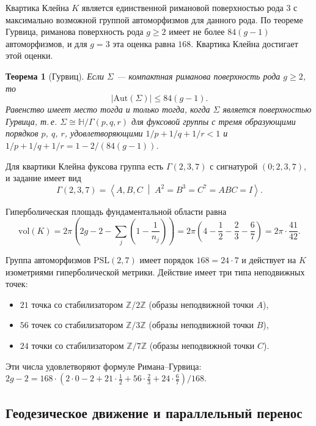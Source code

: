 \documentclass[12pt,a4paper]{article}
\newtheorem{theorem}{Теорема}[section]
\theoremstyle{definition}
\theoremstyle{remark}
\newcommand{\ZZ}{\mathbb{Z}}
\newcommand{\HH}{\mathbb{H}}
\newcommand{\PSL}{\mathrm{PSL}}
\newcommand{\Aut}{\mathrm{Aut}}
\begin{document}
Квартика Клейна $K$ является единственной римановой поверхностью рода $3$ с максимально возможной группой автоморфизмов для данного рода. По теореме Гурвица, риманова поверхность рода $g \geq 2$ имеет не более $84(g-1)$ автоморфизмов, и для $g = 3$ эта оценка равна $168$. Квартика Клейна достигает этой оценки.

\begin{theorem}[Гурвиц]
Если $\Sigma$ --- компактная риманова поверхность рода $g \geq 2$, то
\begin{equation}
|\Aut(\Sigma)| \leq 84(g - 1).
\end{equation}
Равенство имеет место тогда и только тогда, когда $\Sigma$ является поверхностью Гурвица, т.\,е. $\Sigma \cong \HH/\Gamma(p, q, r)$ для фуксовой группы с тремя образующими порядков $p$, $q$, $r$, удовлетворяющими $1/p + 1/q + 1/r < 1$ и $1/p + 1/q + 1/r = 1 - 2/(84(g-1))$.
\end{theorem}

Для квартики Клейна фуксова группа есть $\Gamma(2,3,7)$ с сигнатурой $(0; 2, 3, 7)$, и задание имеет вид
\begin{equation}
\Gamma(2,3,7) = \left\langle A, B, C \;\middle|\; A^2 = B^3 = C^7 = ABC = I \right\rangle.
\end{equation}

Гиперболическая площадь фундаментальной области равна
\begin{equation}
\mathrm{vol}(K) = 2\pi\left(2g - 2 - \sum_{j} \left(1 - \frac{1}{n_j}\right)\right) = 2\pi\left(4 - \frac{1}{2} - \frac{2}{3} - \frac{6}{7}\right) = 2\pi \cdot \frac{41}{42}.
\end{equation}

Группа автоморфизмов $\PSL(2,7)$ имеет порядок $168 = 24 \cdot 7$ и действует на $K$ изометриями гиперболической метрики. Действие имеет три типа неподвижных точек:
\begin{itemize}
\item $21$ точка со стабилизатором $\ZZ/2\ZZ$ (образы неподвижной точки $A$),
\item $56$ точек со стабилизатором $\ZZ/3\ZZ$ (образы неподвижной точки $B$),
\item $24$ точки со стабилизатором $\ZZ/7\ZZ$ (образы неподвижной точки $C$).
\end{itemize}
Эти числа удовлетворяют формуле Римана--Гурвица: $2g - 2 = 168 \cdot (2 \cdot 0 - 2 + 21 \cdot \frac{1}{2} + 56 \cdot \frac{2}{3} + 24 \cdot \frac{6}{7})/168$.

\subsection{Геодезическое движение и параллельный перенос}
\end{document}
